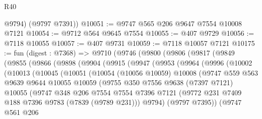 \begin{lexlean}{R40}
\begin{coremodule}
        @9794)
      (@9797 @7391))
@10051 := @9747 @565 @206 @9647 @7554 @10008 @7121
@10054 := @9712 @564 @9645 @7554
@10055 := @407 @9729
@10056 := @7118 @10055
@10057 := @407 @9731
@10059 := @7118 @10057 @7121
@10175 := fun (digest : @7368) =>
  @9710
    (@9746
      (@9800
        (@9806
          (@9817
            (@9849
              (@9855
                (@9866
                  (@9898
                    (@9904
                      (@9915
                        (@9947
                          (@9953
                            (@9964
                              (@9996
                                (@10002
                                  (@10013
                                    (@10045
                                      (@10051
                                        (@10054
                                          (@10056 @10059)
                                          @10008
                                          (@9747
                                            @559
                                            @563
                                            @9639
                                            @9644
                                            @10055
                                            @10059
                                            (@9755
                                              @350
                                              @7556
                                              @9638
                                              (@7397 @7121)
                                              @10055
                                              (@9747
                                                @348
                                                @206
                                                @7554
                                                @7554
                                                @7396
                                                @7121
                                                (@9772
                                                  @231
                                                  @7409
                                                  @188
                                                  @7396
                                                  @9783
                                                  (@7839 (@9789 @231)))
                                                @9794)
                                              (@9797 @7395))
                                            (@9747
                                              @561
                                              @206

\end{coremodule}
\end{lexlean}
